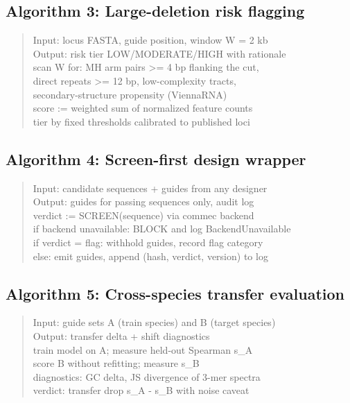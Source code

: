 \documentclass[12pt]{article}
\begin{document}
\subsection*{Algorithm 3: Large-deletion risk flagging}
\begin{quote}\ttfamily\small
Input: locus FASTA, guide position, window W = 2 kb\\
Output: risk tier LOW/MODERATE/HIGH with rationale\\
\hspace*{1em}scan W for: MH arm pairs >= 4 bp flanking the cut,\\
\hspace*{2em}direct repeats >= 12 bp, low-complexity tracts,\\
\hspace*{2em}secondary-structure propensity (ViennaRNA)\\
\hspace*{1em}score := weighted sum of normalized feature counts\\
\hspace*{1em}tier by fixed thresholds calibrated to published loci
\end{quote}
\subsection*{Algorithm 4: Screen-first design wrapper}
\begin{quote}\ttfamily\small
Input: candidate sequences + guides from any designer\\
Output: guides for passing sequences only, audit log\\
\hspace*{1em}verdict := SCREEN(sequence) via commec backend\\
\hspace*{1em}if backend unavailable: BLOCK and log BackendUnavailable\\
\hspace*{1em}if verdict = flag: withhold guides, record flag category\\
\hspace*{1em}else: emit guides, append (hash, verdict, version) to log
\end{quote}
\subsection*{Algorithm 5: Cross-species transfer evaluation}
\begin{quote}\ttfamily\small
Input: guide sets A (train species) and B (target species)\\
Output: transfer delta + shift diagnostics\\
\hspace*{1em}train model on A; measure held-out Spearman s\_A\\
\hspace*{1em}score B without refitting; measure s\_B\\
\hspace*{1em}diagnostics: GC delta, JS divergence of 3-mer spectra\\
\hspace*{1em}verdict: transfer drop s\_A - s\_B with noise caveat
\end{quote}
\end{document}
